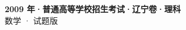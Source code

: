 \documentclass[zihao=-4, a4paper]{ctexart}
\begin{document}
\begin{center}
  {\Large\bfseries 2009 年·普通高等学校招生考试·辽宁卷·理科}\\[4pt]
  {\large 数学 · 试题版}
\end{center}
\medskip
{}

\end{document}
